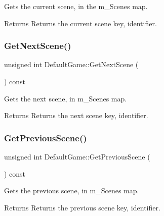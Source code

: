 Gets the current scene, in the m\+\_\+\+Scenes map. 

\begin{DoxyReturn}{Returns}
Returns the current scene key, identifier. 
\end{DoxyReturn}
\mbox{\label{class_default_game_a2962282bb0a25d369532c083de9edf8f}} 
\subsubsection{\texorpdfstring{GetNextScene()}{GetNextScene()}}
{\footnotesize\ttfamily unsigned int Default\+Game\+::\+Get\+Next\+Scene (\begin{DoxyParamCaption}{ }\end{DoxyParamCaption}) const}



Gets the next scene, in m\+\_\+\+Scenes map. 

\begin{DoxyReturn}{Returns}
Returns the next scene key, identifier. 
\end{DoxyReturn}
\mbox{\label{class_default_game_a61dda5998f4587d654d7f651c5ed5d83}} 
\subsubsection{\texorpdfstring{GetPreviousScene()}{GetPreviousScene()}}
{\footnotesize\ttfamily unsigned int Default\+Game\+::\+Get\+Previous\+Scene (\begin{DoxyParamCaption}{ }\end{DoxyParamCaption}) const}



Gets the previous scene, in m\+\_\+\+Scenes map. 

\begin{DoxyReturn}{Returns}
Returns the previous scene key, identifier. 
\end{DoxyReturn}
\mbox{\label{class_default_game_ad5cc1efff4785b26da69b4dc942cc9fd}} 
